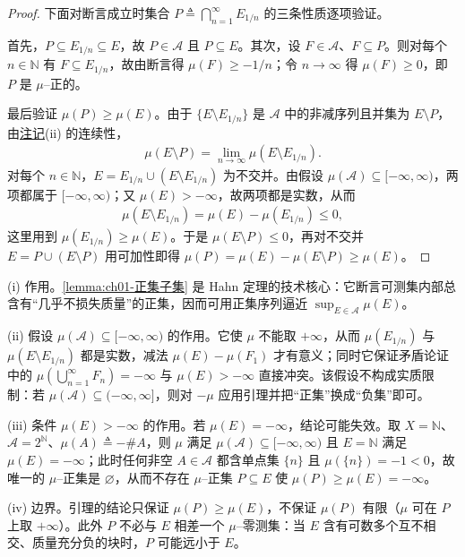 \documentclass[../../main.tex]{subfiles}%
\begin{document}
\begin{proof}
下面对断言成立时集合 $P\triangleq\bigcap_{n=1}^\infty E_{1/n}$ 的三条性质逐项验证。

首先，$P\subseteq E_{1/n}\subseteq E$，故 $P\in\mathcal{A}$ 且 $P\subseteq E$。其次，设 $F\in\mathcal{A}$、$F\subseteq P$。则对每个 $n\in\mathbb{N}$ 有 $F\subseteq E_{1/n}$，故由断言得 $\mu(F)\geqslant-1/n$；令 $n\to\infty$ 得 $\mu(F)\geqslant0$，即 $P$ 是 $\mu$--正的。

最后验证 $\mu(P)\geqslant\mu(E)$。由于 $\{E\setminus E_{1/n}\}$ 是 $\mathcal{A}$ 中的非减序列且并集为 $E\setminus P$，由\hyperref[remark:ch01-带号测度性质]{注记}(ii) 的连续性，
\begin{align*}
\mu(E\setminus P)=\lim_{n\to\infty}\mu(E\setminus E_{1/n}).
\end{align*}
对每个 $n\in\mathbb{N}$，$E=E_{1/n}\cup(E\setminus E_{1/n})$ 为不交并。由假设 $\mu(\mathcal{A})\subseteq[-\infty,\infty)$，两项都属于 $[-\infty,\infty)$；又 $\mu(E)>-\infty$，故两项都是实数，从而
\begin{align*}
\mu(E\setminus E_{1/n})=\mu(E)-\mu(E_{1/n})\leqslant0,
\end{align*}
这里用到 $\mu(E_{1/n})\geqslant\mu(E)$。于是 $\mu(E\setminus P)\leqslant0$，再对不交并 $E=P\cup(E\setminus P)$ 用可加性即得 $\mu(P)=\mu(E)-\mu(E\setminus P)\geqslant\mu(E)$。
\end{proof}

\begin{remark}\label{remark:ch01-正集子集动机}
(i) 作用。\cref{lemma:ch01-正集子集} 是 Hahn 定理的技术核心：它断言可测集内部总含有“几乎不损失质量”的正集，因而可用正集序列逼近 $\sup_{E\in\mathcal{A}}\mu(E)$。

(ii) 假设 $\mu(\mathcal{A})\subseteq[-\infty,\infty)$ 的作用。它使 $\mu$ 不能取 $+\infty$，从而 $\mu(E_{1/n})$ 与 $\mu(E\setminus E_{1/n})$ 都是实数，减法 $\mu(E)-\mu(F_1)$ 才有意义；同时它保证矛盾论证中的 $\mu\left(\bigcup_{n=1}^\infty F_n\right)=-\infty$ 与 $\mu(E)>-\infty$ 直接冲突。该假设不构成实质限制：若 $\mu(\mathcal{A})\subseteq(-\infty,\infty]$，则对 $-\mu$ 应用引理并把“正集”换成“负集”即可。

(iii) 条件 $\mu(E)>-\infty$ 的作用。若 $\mu(E)=-\infty$，结论可能失效。取 $X=\mathbb{N}$、$\mathcal{A}=2^{\mathbb{N}}$、$\mu(A)\triangleq-\#A$，则 $\mu$ 满足 $\mu(\mathcal{A})\subseteq[-\infty,\infty)$ 且 $E=\mathbb{N}$ 满足 $\mu(E)=-\infty$；此时任何非空 $A\in\mathcal{A}$ 都含单点集 $\{n\}$ 且 $\mu(\{n\})=-1<0$，故唯一的 $\mu$--正集是 $\varnothing$，从而不存在 $\mu$--正集 $P\subseteq E$ 使 $\mu(P)\geqslant\mu(E)=-\infty$。

(iv) 边界。引理的结论只保证 $\mu(P)\geqslant\mu(E)$，不保证 $\mu(P)$ 有限（$\mu$ 可在 $P$ 上取 $+\infty$）。此外 $P$ 不必与 $E$ 相差一个 $\mu$--零测集：当 $E$ 含有可数多个互不相交、质量充分负的块时，$P$ 可能远小于 $E$。
\end{remark}
\end{document}
